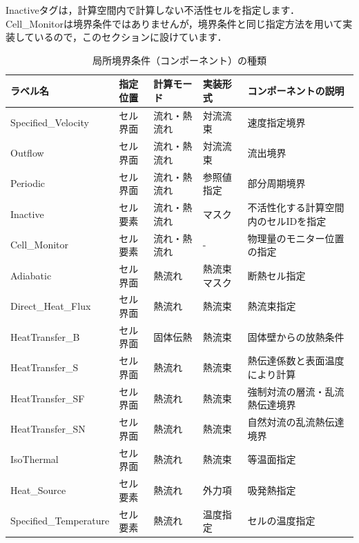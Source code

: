 Inactiveタグは，計算空間内で計算しない不活性セルを指定します．
Cell\_Monitorは境界条件ではありませんが，境界条件と同じ指定方法を用いて実装しているので，このセクションに設けています．


\begin{table}[htdp]
\caption{局所境界条件（コンポーネント）の種類}
\begin{center}
\small
\begin{tabular}{lllll} \toprule
ラベル名 & 指定位置 & 計算モード & 実装形式 & コンポーネントの説明\\ \midrule
Specified\_Velocity & セル界面 & 流れ・熱流れ & 対流流束 & 速度指定境界\\
Outflow & セル界面 & 流れ・熱流れ & 対流流束 & 流出境界\\
Periodic & セル界面 & 流れ・熱流れ & 参照値指定 & 部分周期境界\\
Inactive & セル要素 & 流れ・熱流れ & マスク & 不活性化する計算空間内のセルIDを指定\\
Cell\_Monitor & セル要素 & 流れ・熱流れ & - & 物理量のモニター位置の指定\\ 
Adiabatic & セル界面 & 熱流れ & 熱流束マスク & 断熱セル指定\\
Direct\_Heat\_Flux & セル界面 & 熱流れ & 熱流束 & 熱流束指定\\
HeatTransfer\_B & セル界面 & 固体伝熱 & 熱流束 & 固体壁からの放熱条件\\
HeatTransfer\_S & セル界面 & 熱流れ & 熱流束 & 熱伝達係数と表面温度により計算\\
HeatTransfer\_SF & セル界面 & 熱流れ & 熱流束 & 強制対流の層流・乱流熱伝達境界\\
HeatTransfer\_SN & セル界面 & 熱流れ & 熱流束 & 自然対流の乱流熱伝達境界\\
IsoThermal & セル界面 & 熱流れ & 熱流束 & 等温面指定\\
Heat\_Source & セル要素 & 熱流れ & 外力項 & 吸発熱指定\\
Specified\_Temperature & セル要素 & 熱流れ & 温度指定 & セルの温度指定\\
\bottomrule
\end{tabular}
\end{center}
\label{tbl:tag_ibc}
\end{table}


